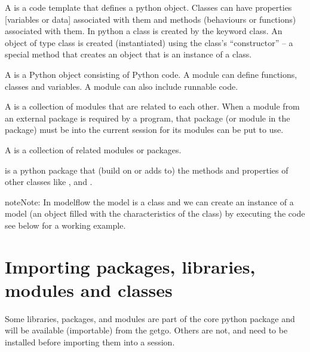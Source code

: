 \documentclass[letterpaper,10pt,english]{jupyterBook}
\begin{document}
\sphinxAtStartPar
A  is a code template that defines a python object. Classes can have properties {[}variables or data{]} associated with them and methods (behaviours or functions) associated with them. In python a class is created by the keyword class. An object of type class is created (instantiated) using the class’s “constructor” – a special method that creates an object that is an instance of a class.

\sphinxAtStartPar
A  is a Python object consisting of Python code. A module can define functions, classes and variables. A module can also include runnable code.

\sphinxAtStartPar
A  is a collection of modules that are related to each other. When a module from an external package is required by a program, that package (or module in the package) must  be  into the current session for its modules can be put to use.

\sphinxAtStartPar
A  is a collection of related modules or packages.

\sphinxAtStartPar
{} is a python package that  (build on or adds to) the methods and properties of other  classes like ,  and .

\begin{sphinxadmonition}{note}{Note:}
\sphinxAtStartPar
In modelflow the model is a class and we can create an instance of a model (an object filled with the characteristics of the class) by executing the code  see below for a working example.
\end{sphinxadmonition}


\section{Importing packages, libraries, modules and classes}
\label{\detokenize{content/04_PythonEssentials/PythonPandasDataframes:importing-packages-libraries-modules-and-classes}}
\sphinxAtStartPar
Some libraries, packages, and modules are part of the core python package and will be available (importable) from the get\sphinxhyphen{}go.  Others are not, and need to be installed before importing them into a session.
\end{document}
